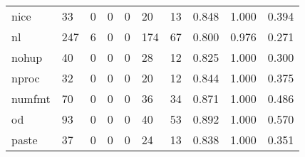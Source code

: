 \begin{longtable}{lp{1.3cm}p{1.3cm}p{1.3cm}p{1.3cm}p{1.3cm}p{1.3cm}p{1.3cm}p{1.3cm}p{1.3cm}}
nice      &                     33 &                                             0 &                                            0 &                                           0 &                                           20 &                                         13 &                                0.848 &                                  1.000 &                                0.394 \\
nl        &                    247 &                                             6 &                                            0 &                                           0 &                                          174 &                                         67 &                                0.800 &                                  0.976 &                                0.271 \\
nohup     &                     40 &                                             0 &                                            0 &                                           0 &                                           28 &                                         12 &                                0.825 &                                  1.000 &                                0.300 \\
nproc     &                     32 &                                             0 &                                            0 &                                           0 &                                           20 &                                         12 &                                0.844 &                                  1.000 &                                0.375 \\
numfmt    &                     70 &                                             0 &                                            0 &                                           0 &                                           36 &                                         34 &                                0.871 &                                  1.000 &                                0.486 \\
od        &                     93 &                                             0 &                                            0 &                                           0 &                                           40 &                                         53 &                                0.892 &                                  1.000 &                                0.570 \\
paste     &                     37 &                                             0 &                                            0 &                                           0 &                                           24 &                                         13 &                                0.838 &                                  1.000 &                                0.351 \\

\end{longtable}
